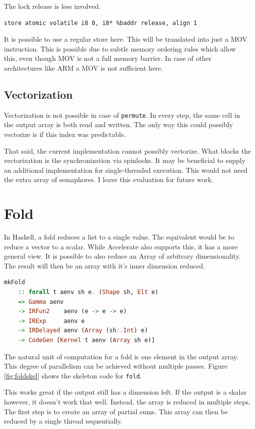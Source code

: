 \documentclass[a4paper,bibliography=totocnumbered,parskip,headsepline]{scrbook}
\begin{document}
The lock release is less involved.
\begin{lstlisting}
store atomic volatile i8 0, i8* %baddr release, align 1
\end{lstlisting}
It is possible to use a regular store here.
This will be translated into just a MOV instruction.
This is possible due to subtle memory ordering rules which allow this, even though MOV is not a full memory barrier.
In case of other architectures like ARM a MOV is not sufficient here.

\subsection*{Vectorization}
Vectorization is not possible in case of \lstinline[language=haskell]!permute!.
In every step, the same cell in the output array is both read and written.
The only way this could possibly vectorize is if this index was predictable.

That said, the current implementation cannot possibly vectorize.
What blocks the vectorization is the synchronization via spinlocks.
It may be beneficial to supply an additional implementation for single-threaded execution.
This would not need the extra array of semaphores.
I leave this evaluation for future work.

\section{Fold}
In Haskell, a fold reduces a list to a single value.
The equivalent would be to reduce a vector to a scalar.
While Accelerate also supports this, it has a more general view.
It is possible to also reduce an Array of arbitrary dimensionality.
The result will then be an array with it's inner dimension reduced.

\begin{lstlisting}[language=haskell]
mkFold
    :: forall t aenv sh e. (Shape sh, Elt e)
    => Gamma aenv
    -> IRFun2    aenv (e -> e -> e)
    -> IRExp     aenv e
    -> IRDelayed aenv (Array (sh:.Int) e)
    -> CodeGen [Kernel t aenv (Array sh e)]
\end{lstlisting}

The natural unit of computation for a fold is one element in the output array.
This degree of parallelism can be achieved without multiple passes.
Figure \ref{fig:foldskel} shows the skeleton code for \lstinline[language=haskell]!fold!.

This works great if the output still has a dimension left.
If the output is a skalar however, it doesn't work that well.
Instead, the array is reduced in multiple steps.
The first step is to create an array of partial sums.
This array can then be reduced by a single thread sequentially.
\end{document}
